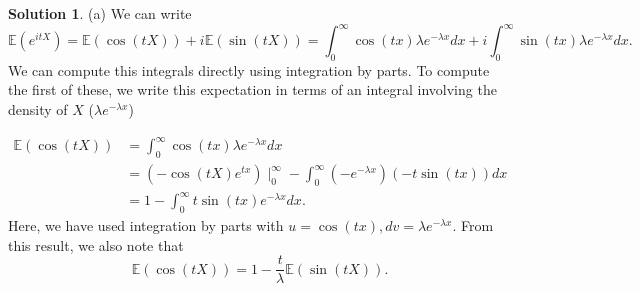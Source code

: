 \documentclass[12pt]{article}
\newcommand{\Expect}{\mathbb{E}}
\theoremstyle{definition}
\newtheorem{sol}{Solution}
\theoremstyle{remark}
\begin{document}
\begin{sol}\leavevmode
    (a) We can write 
    \begin{equation*}
        \Expect(e^{itX}) 
        = 
        \Expect(\cos(tX)) + i \Expect(\sin(tX)) 
        = 
        \int_{0}^{\infty } \cos(tx) \lambda e^{-\lambda x}dx  + i \int_{0}^{\infty } \sin(tx) \lambda e^{-\lambda x}dx  .
    \end{equation*}
    We can compute this integrals directly using integration by parts. To compute the first of these, we write this expectation in terms of an integral involving the density of $X$ ($\lambda e^{- \lambda x}$)

    \begin{align*}
        \Expect(\cos(tX)) &= \int_{0}^{\infty } \cos(tx) \lambda e^{-\lambda x}dx\\
                          &= (-\cos(tX)e^{tx}) \mid_{0}^{\infty } - \int_{0}^{\infty } (-e^{-\lambda x})(-t \sin(tx))dx\\
                          &= 1 - \int_{0}^{\infty} t\sin(tx)e^{-\lambda x}dx.
    \end{align*}
    Here, we have used integration by parts with $u = \cos(tx), dv = \lambda e^{-\lambda x}$. From this result, we also note that
    \begin{equation}
        \label{eq:2aCheat}
        \Expect(\cos(tX)) = 1 - \frac{t}{\lambda} \Expect(\sin(tX)).
    \end{equation}


\end{sol}
\end{document}
